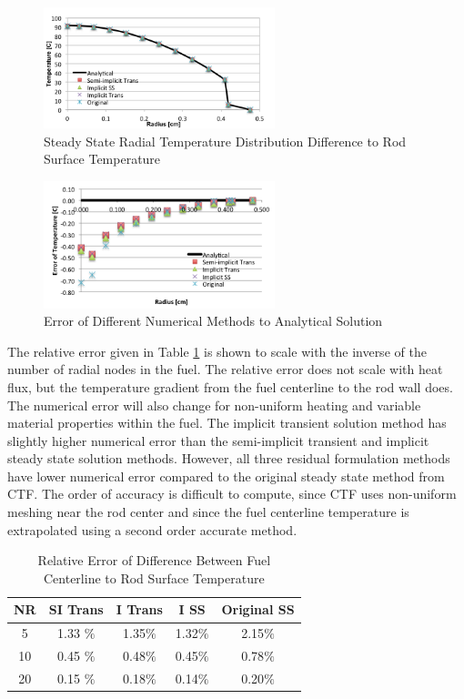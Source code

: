 \begin{figure}[!h]
	\centering
	\includegraphics[width=0.60\textwidth]{images/Rod_Profile_Summary.png}
	\caption{Steady State Radial Temperature Distribution Difference to Rod Surface Temperature }
	\label{fig:Rod_Profile_Summary}
\end{figure}

\begin{figure}[!h]
	\centering
	\includegraphics[width=0.60\textwidth]{images/Rod_Profile_Errors.png}
	\caption{Error of Different Numerical Methods to Analytical Solution}
	\label{fig:Rod_Profile_Errors}
\end{figure}

The relative error given in Table \ref{table:heating:errors} is shown to
scale with the inverse of the number of radial nodes in the fuel. The relative error does not scale with heat
flux, but the temperature gradient from the fuel centerline to the rod wall
does. The numerical error will also change for non-uniform heating and variable
material properties within the fuel. The implicit transient solution method has
slightly higher numerical error than the semi-implicit transient and implicit
steady state solution methods. However, all three residual formulation methods
have lower numerical error compared to the original steady state method from
CTF. The order of accuracy is difficult to compute, since CTF uses non-uniform
meshing near the rod center and since the fuel centerline temperature is
extrapolated using a second order accurate method. 

\begin{table}[h]
\center
\caption{Relative Error of Difference Between Fuel Centerline to Rod Surface Temperature}
\label{table:heating:errors}
\begin{tabular}{|c|c|c|c|c|}
\hline
NR &	SI Trans	&	I Trans	& I SS & Original SS	\\ \hline
5  & 1.33 $ \% $ & 1.35$ \% $ & 1.32$ \% $ & 2.15$ \% $ \\ \hline
10 & 0.45 $ \% $ & 0.48$ \% $ & 0.45$ \% $ & 0.78$ \% $ \\ \hline
20 & 0.15 $ \% $ & 0.18$ \% $ & 0.14$ \% $ & 0.20$ \% $ \\ \hline
\end{tabular}
\end{table}


